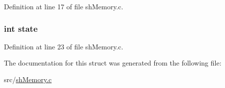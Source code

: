 Definition at line 17 of file shMemory.c.

\hypertarget{structsh_mem_a89f234133d3efe315836311cbf21c64b}{
\subsubsection[{state}]{\setlength{\rightskip}{0pt plus 5cm}int {\bf state}}}
\label{structsh_mem_a89f234133d3efe315836311cbf21c64b}


Definition at line 23 of file shMemory.c.



The documentation for this struct was generated from the following file:\begin{DoxyCompactItemize}
\item 
src/\hyperlink{sh_memory_8c}{shMemory.c}\end{DoxyCompactItemize}
